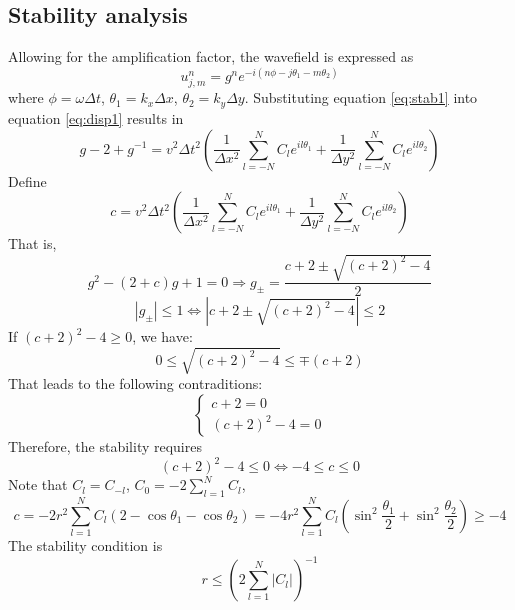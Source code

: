 \subsection{Stability analysis}
Allowing for the amplification factor, the wavefield is expressed as
\begin{equation}\label{eq:stab1}
 u_{j,m}^{n}=g^n e^{-i(n\phi-j\theta_1-m\theta_2)}
\end{equation}
where $\phi=\omega\Delta t$, $\theta_1=k_x\Delta x$, $\theta_2=k_y\Delta y$.
Substituting equation \eqref{eq:stab1} into equation \eqref{eq:disp1} results in
\begin{equation}
 g-2+g^{-1}=v^2\Delta t^2\left(
 \frac{1}{\Delta x^2}\sum_{l=-N}^N C_l e^{i l \theta_1}+
 \frac{1}{\Delta y^2}\sum_{l=-N}^N C_l e^{i l \theta_2}
 \right)
\end{equation}
Define
\begin{equation}
 c=v^2\Delta t^2\left(
 \frac{1}{\Delta x^2}\sum_{l=-N}^N C_l e^{i l \theta_1}+
 \frac{1}{\Delta y^2}\sum_{l=-N}^N C_l e^{i l \theta_2}
 \right)
\end{equation}
That is,
\begin{equation}
 g^2-\left(2+c\right)g+1=0\Rightarrow
 g_{\pm}=\frac{c+2\pm\sqrt{(c+2)^2-4}}{2}
\end{equation}
\begin{equation}
|g_{\pm}|\leq 1\Leftrightarrow
|c+2\pm\sqrt{(c+2)^2-4}|\leq 2
\end{equation}
If $(c+2)^2-4\geq 0$, we have:
\begin{equation}
 0\leq\sqrt{(c+2)^2-4}\leq \mp(c+2)
\end{equation}
That leads to the following contraditions:
\begin{equation}
 \begin{cases}
  c+2=0\\
  (c+2)^2-4=0
 \end{cases}
\end{equation}
Therefore, the stability requires
\begin{equation}
 (c+2)^2-4\leq 0 \Leftrightarrow -4\leq c\leq 0
\end{equation}
Note that  $C_l=C_{-l}$,  $C_0=-2\sum_{l=1}^N C_l$,
\begin{equation}
 c=-2r^2\sum_{l=1}^N C_l(2-\cos\theta_1-\cos\theta_2)
 =-4r^2\sum_{l=1}^N C_l(\sin^2\frac{\theta_1}{2}+\sin^2\frac{\theta_2}{2})\geq -4
\end{equation}
The stability condition is
\begin{equation}
 r\leq \left(2\sum_{l=1}^N |C_l|
 \right)^{-1}
\end{equation}




